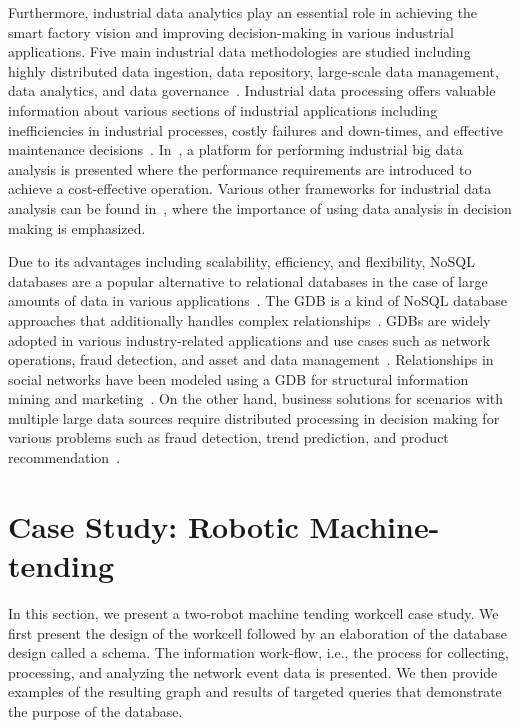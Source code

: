 Furthermore, industrial data analytics play an essential role in achieving the smart factory vision and improving decision-making in various industrial applications. Five main industrial data methodologies are studied including highly distributed data ingestion, data repository, large-scale data management, data analytics, and data governance~\cite{DBLP:journals/corr/abs-1807-01016}. Industrial data processing offers valuable information about various sections of industrial applications including inefficiencies in industrial processes, costly failures and down-times, and effective maintenance decisions~\cite{JLee}. In~\cite{4}, a platform for performing industrial big data analysis is presented where the performance requirements are introduced to achieve a cost-effective operation. Various other frameworks for industrial data analysis can be found in~\cite{5,6}, where the importance of using data analysis in decision making is emphasized.

Due to its advantages including scalability, efficiency, and flexibility, NoSQL databases are a popular alternative to relational databases in the case of large amounts of data in various applications~\cite{doi:10.1108/17440081311316398}. The GDB is a kind of NoSQL database approaches that additionally handles complex relationships~\cite{8123475}. GDBs are widely adopted in various industry-related applications and use cases such as network operations, fraud detection, and asset and data management~\cite{top5}. Relationships in social networks have been modeled using a GDB for structural information mining and marketing~\cite{Gomez-Rodriguez:2012:IND:2086737.2086741}. On the other hand, business solutions for scenarios with multiple large data sources require distributed processing in decision making for various problems such as fraud detection, trend prediction, and product recommendation~\cite{Skhiri2013}.

\section{Case Study: Robotic Machine-tending}
In this section, we present a two-robot machine tending workcell case study.  We first present the design of the workcell followed by an elaboration of the database design called a schema.  The information work-flow, i.e., the process for collecting, processing, and analyzing the network event data is presented.  We then provide examples of the resulting graph and results of targeted queries that demonstrate the purpose of the database. 
